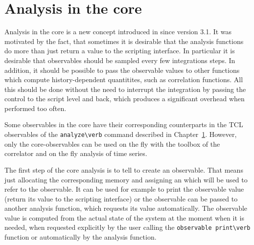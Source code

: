 %  
%   
%  
%  
%
\newcommand{\taumax}{\tau_{\mathrm{max}}}
\newcommand{\taumin}{\tau_{\mathrm{min}}}

\chapter{Analysis in the core}
\label{chap:analysis-core}

Analysis in the core is a new concept introduced in \es since version 3.1.
It was motivated by the fact, that sometimes it is desirable that the analysis
functions do more than just return a value to the scripting interface.
In particular it is desirable that observables should be sampled every few
integrations steps. In addition, it should be possible to pass the
observable values to other functions which compute history-dependent
quantitites, such as correlation functions.  
All this should be done without the need to interrupt
the integration by passing the control to the script level and back, which
produces a significant overhead when performed too often. 

Some observables in the core have their corresponding counterparts
in the TCL observables of the \verb!analyze\verb! command
described in Chapter~\ref{chap:analysis-core}. 
However, only the core-observables can be used on the fly with the 
toolbox of the correlator and on the fly analysis of time series.

The first step of the core analysis is to tell \es to create an observable.
That means just allocating the corresponding memory and assigning an 
which will be used to refer to the observable. It can be used for example to print
the observable value (return its value to the scripting interface) or
the observable  can be passed to another analysis function, which
requests its value automatically.
The observable value is computed from the actual state of the system
at the moment when it is needed, \ie when requested explicitly by the 
user calling the \verb!observable print\verb! function or 
automatically by the analysis function.

